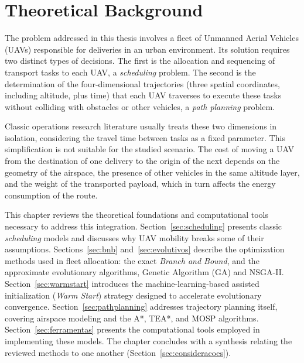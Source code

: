 \chapter{Theoretical Background}\label{cap:conceptual}

The problem addressed in this thesis involves a fleet of Unmanned Aerial Vehicles (UAVs) responsible for deliveries in an urban environment. Its solution requires two distinct types of decisions. The first is the allocation and sequencing of transport tasks to each UAV, a \textit{scheduling} problem. The second is the determination of the four-dimensional trajectories (three spatial coordinates, including altitude, plus time) that each UAV traverses to execute these tasks without colliding with obstacles or other vehicles, a \textit{path planning} problem.

Classic operations research literature usually treats these two dimensions in isolation, considering the travel time between tasks as a fixed parameter. This simplification is not suitable for the studied scenario. The cost of moving a UAV from the destination of one delivery to the origin of the next depends on the geometry of the airspace, the presence of other vehicles in the same altitude layer, and the weight of the transported payload, which in turn affects the energy consumption of the route.

This chapter reviews the theoretical foundations and computational tools necessary to address this integration. Section~\ref{sec:scheduling} presents classic \textit{scheduling} models and discusses why UAV mobility breaks some of their assumptions. Sections~\ref{sec:bnb} and~\ref{sec:evolutivos} describe the optimization methods used in fleet allocation: the exact \textit{Branch and Bound}, and the approximate evolutionary algorithms, Genetic Algorithm (GA) and NSGA-II. Section~\ref{sec:warmstart} introduces the machine-learning-based assisted initialization (\textit{Warm Start}) strategy designed to accelerate evolutionary convergence. Section~\ref{sec:pathplanning} addresses trajectory planning itself, covering airspace modeling and the A*, TEA*, and MOSP algorithms. Section~\ref{sec:ferramentas} presents the computational tools employed in implementing these models. The chapter concludes with a synthesis relating the reviewed methods to one another (Section~\ref{sec:consideracoes}).

